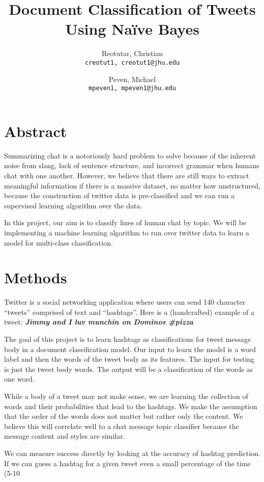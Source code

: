 \documentclass[11pt]{article}
\title{Document Classification of Tweets Using Na{\"i}ve Bayes}
\author{
  Reotutar, Christian\\
  \texttt{creotut1, creotut1@jhu.edu}
  \and
  Peven, Michael\\
  \texttt{mpeven1, mpeven1@jhu.edu}
}
\date{}
\begin{document}
\maketitle

\section{Abstract}
Summarizing chat is a notoriously hard problem to solve because of the inherent noise from slang, lack of sentence structure, and incorrect grammar when humans chat with one another. However, we believe that there are still ways to extract meaningful information if there is a massive dataset, no matter how unstructured, because the construction of twitter data is pre-classified and we can run a supervised learning algorithm over the data.

In this project, our aim is to classify lines of human chat by topic. We will be implementing a machine learning algorithm to run over twitter data to learn a model for multi-class classification.

\section{Methods}
Twitter is a social networking application where users can send 140 character “tweets” comprised of text and “hashtags”. Here is a (handcrafted) example of a tweet: \textbf{\textit{Jimmy and I luv munchin on Dominos \#pizza}}

The goal of this project is to learn hashtags as classifications for tweet message body in a document classification model. Our input to learn the model is a word label and then the words of the tweet body as its features. The input for testing is just the tweet body words. The output will be a classification of the words as one word.

While a body of a tweet may not make sense, we are learning the collection of words and their probabilities that lead to the hashtags. We make the assumption that the order of the words does not matter but rather only the content.  We believe this will correlate well to a chat message topic classifier because the message content and styles are similar.

We can measure success directly by looking at the accuracy of hashtag prediction. If we can guess a hashtag for a given tweet even a small percentage of the time (5-10%
\end{document}
